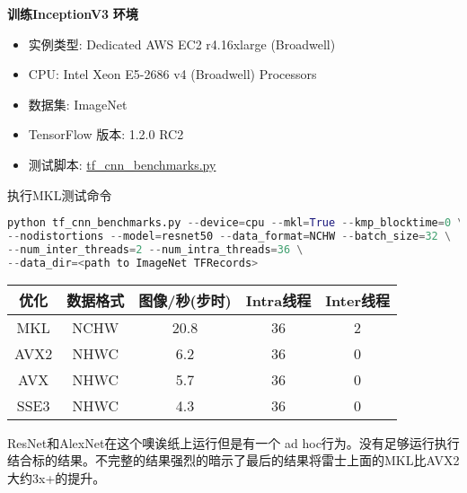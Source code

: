 \textbf{训练InceptionV3}\newline
\textbf{环境}
\begin{itemize}
	\item 实例类型: Dedicated AWS EC2 r4.16xlarge (Broadwell)
	\item CPU: Intel Xeon E5-2686 v4 (Broadwell) Processors
	\item 数据集: ImageNet
	\item TensorFlow 版本: 1.2.0 RC2
	\item 测试脚本: \href{https://github.com/tensorflow/benchmarks/blob/mkl_experiment/scripts/tf_cnn_benchmarks/tf_cnn_benchmarks.py}{tf\_cnn\_benchmarks.py}
\end{itemize}

执行MKL测试命令
\begin{lstlisting}[language=Python]
python tf_cnn_benchmarks.py --device=cpu --mkl=True --kmp_blocktime=0 \
--nodistortions --model=resnet50 --data_format=NCHW --batch_size=32 \
--num_inter_threads=2 --num_intra_threads=36 \
--data_dir=<path to ImageNet TFRecords>
\end{lstlisting}
\begin{tabular}{|c|c|c|c|c|}
\hline
优化&数据格式&图像/秒(步时)&Intra线程&Inter线程\\
\hline
MKL&	NCHW&	20.8&	36&	2\\
\hline
AVX2&	NHWC&	6.2&	36&	0\\
\hline
AVX&	NHWC&	5.7&	36&	0\\
\hline
SSE3&	NHWC&	4.3&	36&	0\\
\hline
\end{tabular}
ResNet和AlexNet在这个噢诶纸上运行但是有一个 ad hoc行为。没有足够运行执行结合标的结果。不完整的结果强烈的暗示了最后的结果将雷士上面的MKL比AVX2大约3x+的提升。
